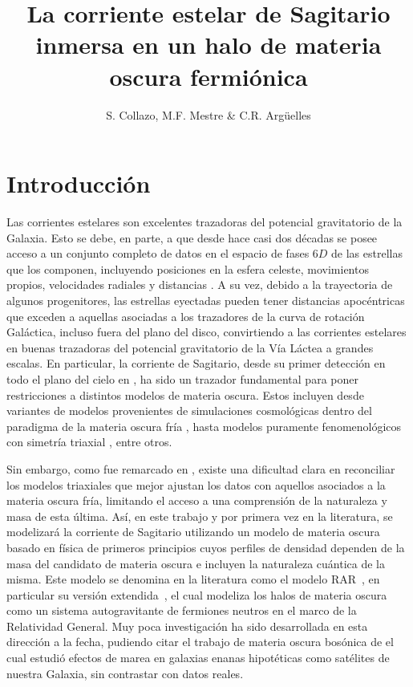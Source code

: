 \documentclass[baaa]{baaa}
\title{La corriente estelar de Sagitario inmersa en un halo de materia oscura fermiónica}
\author{S. Collazo\inst{1,2}, M.F. Mestre\inst{2} \& C.R. Argüelles\inst{2,3}
}
\institute{
Facultad de Ciencias Astronómicas y Geofísicas, UNLP, Argentina
\and
Instituto de Astrofísica de La Plata, CONICET--UNLP, Argentina
\and
International Center for Relativistic Astrophysics Network, Italy
}
\begin{document}
\maketitle

\section{Introducción}

Las corrientes estelares son excelentes trazadoras del potencial gravitatorio de la Galaxia. Esto se debe, en parte, a que desde hace casi dos décadas se posee acceso a un conjunto completo de datos en el espacio de fases $6D$ de las estrellas que los componen, incluyendo posiciones en la esfera celeste, movimientos propios, velocidades radiales y distancias \citep[ver e.g.][]{Ibata2020, Mateu2023}. A su vez, debido a la trayectoria de algunos progenitores, las estrellas eyectadas pueden tener distancias apocéntricas que exceden a aquellas asociadas a los trazadores de la curva de rotación Galáctica, incluso fuera del plano del disco, convirtiendo a las corrientes estelares en buenas trazadoras del potencial gravitatorio de la Vía Láctea a grandes escalas. En particular, la corriente de Sagitario, desde su primer detección en todo el plano del cielo en \cite{2003ApJ...599.1082M}, ha sido un trazador fundamental para poner restricciones a distintos modelos de materia oscura. Estos incluyen desde variantes de modelos provenientes de simulaciones cosmológicas dentro del paradigma de la materia oscura fría \citep{2005ApJ...619..807L}, hasta modelos puramente fenomenológicos con simetría triaxial \citep{Law2010}, entre otros.

Sin embargo, como fue remarcado en \cite{Law2010}, existe una dificultad clara en reconciliar los modelos triaxiales que mejor ajustan los datos con aquellos asociados a la materia oscura fría, limitando el acceso a una comprensión de la naturaleza y masa de esta última. Así, en este trabajo y por primera vez en la literatura, se modelizará la corriente de Sagitario utilizando un modelo de materia oscura basado en física de primeros principios cuyos perfiles de densidad dependen de la masa del candidato de materia oscura e incluyen la naturaleza cuántica de la misma. Este modelo se denomina en la literatura como el modelo RAR~\citep{Ruffini2015}, en particular su versión extendida~\citep{Arguelles2018, Arguelles2021}, el cual modeliza los halos de materia oscura como un sistema autogravitante de fermiones neutros en el marco de la Relatividad General. Muy poca investigación ha sido desarrollada en esta dirección a la fecha, pudiendo citar el trabajo de materia oscura bosónica de \cite{2015ApJ...810...99R} el cual estudió efectos de marea en galaxias enanas hipotéticas como satélites de nuestra Galaxia, sin contrastar con datos reales.
\end{document}
